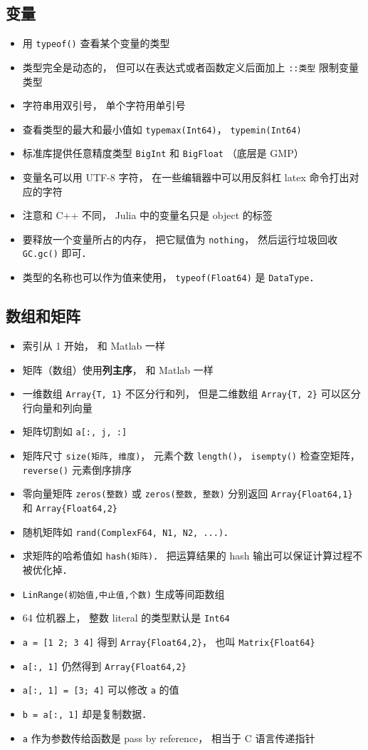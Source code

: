 \subsection{变量}
\begin{itemize}
\item 用 \verb|typeof()| 查看某个变量的类型
\item 类型完全是动态的， 但可以在表达式或者函数定义后面加上 \verb|::类型| 限制变量类型
\item 字符串用双引号， 单个字符用单引号
\item 查看类型的最大和最小值如 \verb|typemax(Int64)|， \verb|typemin(Int64)|
\item 标准库提供任意精度类型 \verb|BigInt| 和 \verb|BigFloat| （底层是 GMP）
\item 变量名可以用 UTF-8 字符， 在一些编辑器中可以用反斜杠 latex 命令打出对应的字符
\item 注意和 C++ 不同， Julia 中的变量名只是 object 的标签
\item 要释放一个变量所占的内存， 把它赋值为 \verb|nothing|， 然后运行垃圾回收 \verb|GC.gc()| 即可．
\item 类型的名称也可以作为值来使用， \verb|typeof(Float64)| 是 \verb|DataType|．
\end{itemize}

\subsection{数组和矩阵}
\begin{itemize}
\item 索引从 1 开始， 和 Matlab 一样
\item 矩阵（数组）使用\textbf{列主序}， 和 Matlab 一样
\item 一维数组 \verb|Array{T, 1}| 不区分行和列， 但是二维数组 \verb|Array{T, 2}| 可以区分行向量和列向量
\item 矩阵切割如 \verb|a[:, j, :]|
\item 矩阵尺寸 \verb|size(矩阵, 维度)|， 元素个数 \verb|length()|， \verb|isempty()| 检查空矩阵， \verb|reverse()| 元素倒序排序
\item 零向量矩阵 \verb|zeros(整数)| 或 \verb|zeros(整数, 整数)| 分别返回 \verb|Array{Float64,1}| 和 \verb|Array{Float64,2}|
\item 随机矩阵如 \verb|rand(ComplexF64, N1, N2, ...)|．
\item 求矩阵的哈希值如 \verb|hash(矩阵)|． 把运算结果的 hash 输出可以保证计算过程不被优化掉．
\item \verb|LinRange(初始值,中止值,个数)| 生成等间距数组
\item 64 位机器上， 整数 literal 的类型默认是 \verb|Int64|
\item \verb|a = [1 2; 3 4]| 得到 \verb|Array{Float64,2}|， 也叫 \verb|Matrix{Float64}|
\item \verb|a[:, 1]| 仍然得到 \verb|Array{Float64,2}|
\item \verb|a[:, 1] = [3; 4]| 可以修改 \verb|a| 的值
\item \verb|b = a[:, 1]| 却是复制数据．
\item \verb|a| 作为参数传给函数是 pass by reference， 相当于 C 语言传递指针
\end{itemize}

